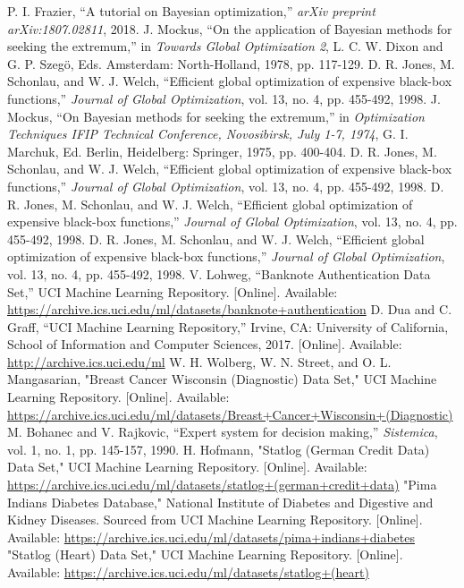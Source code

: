 \documentclass[conference]{IEEEtran}
\begin{document}
\begin{thebibliography}{99}
 P. I. Frazier, “A tutorial on Bayesian optimization,” \textit{arXiv preprint arXiv:1807.02811}, 2018.
 J. Mockus, “On the application of Bayesian methods for seeking the extremum,” in \textit{Towards Global Optimization 2}, L. C. W. Dixon and G. P. Szegö, Eds. Amsterdam: North-Holland, 1978, pp. 117-129.
 D. R. Jones, M. Schonlau, and W. J. Welch, “Efficient global optimization of expensive black-box functions,” \textit{Journal of Global Optimization}, vol. 13, no. 4, pp. 455-492, 1998.
 J. Mockus, “On Bayesian methods for seeking the extremum,” in \textit{Optimization Techniques IFIP Technical Conference, Novosibirsk, July 1-7, 1974}, G. I. Marchuk, Ed. Berlin, Heidelberg: Springer, 1975, pp. 400-404.
 D. R. Jones, M. Schonlau, and W. J. Welch, “Efficient global optimization of expensive black-box functions,” \textit{Journal of Global Optimization}, vol. 13, no. 4, pp. 455-492, 1998.
 D. R. Jones, M. Schonlau, and W. J. Welch, “Efficient global optimization of expensive black-box functions,” \textit{Journal of Global Optimization}, vol. 13, no. 4, pp. 455-492, 1998.
 D. R. Jones, M. Schonlau, and W. J. Welch, “Efficient global optimization of expensive black-box functions,” \textit{Journal of Global Optimization}, vol. 13, no. 4, pp. 455-492, 1998.
 V. Lohweg, “Banknote Authentication Data Set,” UCI Machine Learning Repository. [Online]. Available: \url{https://archive.ics.uci.edu/ml/datasets/banknote+authentication}
 D. Dua and C. Graff, “UCI Machine Learning Repository,” Irvine, CA: University of California, School of Information and Computer Sciences, 2017. [Online]. Available: \url{http://archive.ics.uci.edu/ml}
 W. H. Wolberg, W. N. Street, and O. L. Mangasarian, "Breast Cancer Wisconsin (Diagnostic) Data Set," UCI Machine Learning Repository. [Online]. Available: \url{https://archive.ics.uci.edu/ml/datasets/Breast+Cancer+Wisconsin+(Diagnostic)}
 M. Bohanec and V. Rajkovic, “Expert system for decision making,” \textit{Sistemica}, vol. 1, no. 1, pp. 145-157, 1990.
 H. Hofmann, "Statlog (German Credit Data) Data Set," UCI Machine Learning Repository. [Online]. Available: \url{https://archive.ics.uci.edu/ml/datasets/statlog+(german+credit+data)}
 "Pima Indians Diabetes Database," National Institute of Diabetes and Digestive and Kidney Diseases. Sourced from UCI Machine Learning Repository. [Online]. Available: \url{https://archive.ics.uci.edu/ml/datasets/pima+indians+diabetes}
 "Statlog (Heart) Data Set," UCI Machine Learning Repository. [Online]. Available: \url{https://archive.ics.uci.edu/ml/datasets/statlog+(heart)}

\end{thebibliography}
\end{document}
